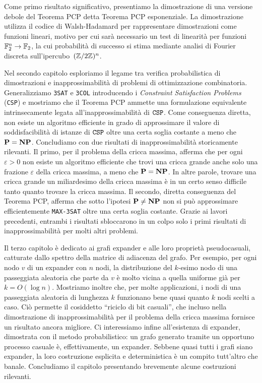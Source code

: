 Come primo risultato significativo, presentiamo la dimostrazione di una versione
debole del Teorema PCP detta Teorema PCP esponenziale.
La dimostrazione utilizza il codice di Walsh-Hadamard per rappresentare
dimostrazioni come funzioni lineari, motivo per cui sarà necessario un test di
linearità per funzioni $\mathbb{F}_2^n \to \mathbb{F}_2$, la cui probabilità di successo si
stima mediante analisi di Fourier discreta sull'ipercubo~$(\mathbb{Z} / 2\mathbb{Z})^n$.

Nel secondo capitolo esploriamo il legame tra verifica probabilistica
di dimostrazioni e inapprossimabilità di problemi di ottimizzazione
combinatoria. Generalizziamo \texttt{3SAT} e \texttt{3COL} introducendo
i \emph{Constraint Satisfaction Problems} (\texttt{CSP}) e mostriamo che il
Teorema PCP ammette una formulazione equivalente intrinsecamente legata
all'inapprossimabilità di $\mathtt{CSP}$.
Come conseguenza diretta, non esiste un algoritmo efficiente in grado di
approssimare il valore di soddisfacibilità di istanze di $\mathtt{CSP}$ oltre una
certa soglia costante a meno che $\mathbf{P} = \mathbf{NP}$.
Concludiamo con due risultati di inapprossimabilità storicamente rilevanti.
Il primo, per il problema della cricca massima, afferma che per ogni
$\varepsilon > 0$ non esiste un algoritmo efficiente che trovi una cricca
grande anche solo una frazione $\varepsilon$ della cricca massima, a meno che
$\mathbf{P} = \mathbf{NP}$.
In altre parole, trovare una cricca grande un miliardesimo della cricca massima
è in un certo senso difficile tanto quanto trovare la cricca massima.
Il secondo, diretta conseguenza del Teorema PCP, afferma che sotto l'ipotesi
$\mathbf{P} \neq \mathbf{NP}$ non si può approssimare efficientemente \texttt{MAX-3SAT} oltre
una certa soglia costante.
Grazie ai lavori precedenti, entrambi i risultati sbloccarono in un colpo solo
i primi risultati di inapprossimabilità per molti altri problemi.

Il terzo capitolo è dedicato ai grafi expander e alle loro proprietà
pseudocasuali, catturate dallo spettro della matrice di adiacenza del grafo.
Per esempio, per ogni nodo $v$ di un expander con $n$ nodi,
la distribuzione del $k$-esimo nodo di una passeggiata aleatoria che parte da
$v$ è molto vicina a quella uniforme già per $k = O(\log n)$.
Mostriamo inoltre che, per molte applicazioni, i nodi di una passeggiata
aleatoria di lunghezza $k$ funzionano bene quasi quanto $k$ nodi scelti a caso.
Ciò permette il cosiddetto ``riciclo di bit casuali'', che incluso nella
dimostrazione di inapprossimabilità per il problema della cricca massima
fornisce un risultato ancora migliore.
Ci interessiamo infine all'esistenza di expander, dimostrata con il metodo
probabilistico: un grafo generato tramite un opportuno processo casuale è,
effettivamente, un expander. Sebbene quasi tutti i grafi siano expander,
la loro costruzione esplicita e deterministica è un compito tutt'altro che
banale. Concludiamo il capitolo presentando brevemente alcune costruzioni
rilevanti.

